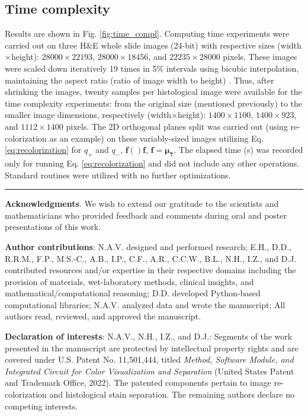\documentclass[superscriptaddress,longbibliography,aps,prl,twocolumn,10pt]{revtex4-2}
\begin{document}
\subsection*{\normalsize{Time complexity}}
Results are shown in Fig. \ref{fig:time_compl}. Computing time experiments were carried out on three H\&E whole slide images (24-bit) with respective sizes (width$\times$height): $28000\times22193$, $28000\times18456$, and $22235\times28000$ pixels. These images were scaled down iteratively 19 times in 5$\%$ intervals using bicubic interpolation, maintaining the aspect ratio (ratio of image width to height) \cite{matlab_toolbox_ref}. Thus, after shrinking the images, twenty samples per histological image were available for the time complexity experiments: from the original size (mentioned previously) to the smaller image dimensions, respectively (width$\times$height): $1400\times1100$, $1400\times923$, and $1112\times1400$ pixels. The 2D orthogonal planes split was carried out (using re-colorization as an example) on these variably-sized images utilizing Eq. \ref{eq:recolorization} for $q_+$ and $q_-$, $\boldsymbol{f}()\boldsymbol{f}$, $\boldsymbol{f} = \boldsymbol{\mu_{7}}$. The elapsed time (s) was recorded only for running Eq. \ref{eq:recolorization} and did not include any other operations. Standard routines were utilized with no further optimizations.

\bigskip
\begin{center}
    \rule{0.40\linewidth}{0.5pt}
\end{center}

\bigskip
\noindent
\small{\textbf{Acknowledgments}. We wish to extend our gratitude to the scientists and mathematicians who provided feedback and comments during oral and poster presentations of this work.}

\medskip
\noindent
\small{{\textbf{Author contributions}: N.A.V. designed and performed research; E.H., D.D., R.R.M., F.P., M.S.-C., A.B., I.P., C.F., A.R., C.C.W., B.L., N.H., I.Z., and D.J. contributed resources and/or expertise in their respective domains including the provision of materials, wet-laboratory methods, clinical insights, and mathematical/computational reasoning; D.D. developed Python-based computational libraries; N.A.V. analyzed data and wrote the manuscript; All authors read, reviewed, and approved the manuscript.}}

\medskip
\noindent
\small{{\textbf{Declaration of interests}: N.A.V., N.H., I.Z., and D.J.: Segments of the work presented in the manuscript are protected by intellectual property rights and are covered under U.S. Patent No. 11,501,444, titled \textit{Method, Software Module, and Integrated Circuit for Color Visualization and Separation} (United States Patent and Trademark Office, 2022). The patented components pertain to image re-colorization and histological stain separation. The remaining authors declare no competing interests.}}


\renewcommand{\bibfont}{\footnotesize}

\end{document}
